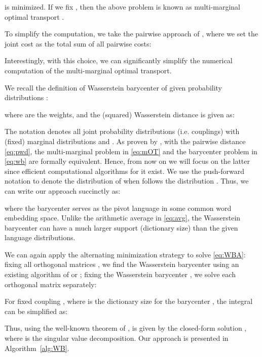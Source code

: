 \documentclass{article}
\begin{document}
is minimized.
If we fix , then the above problem is known as multi-marginal optimal transport \cite{GangboSwiech98}.

To simplify the computation, we take the pairwise approach of \citet{AlauxGCJ19}, where we set the joint cost  as the total sum of all pairwise costs:

Interestingly, with this choice, we can significantly simplify the numerical computation of the multi-marginal optimal transport. 

We recall the definition of Wasserstein barycenter  of  given probability distributions :

where  are the weights, and the (squared) Wasserstein distance  is given as:

The notation  denotes all joint probability distributions (i.e. couplings)  with (fixed) marginal distributions  and .
As proven by \citet{agueh2011barycenter}, with the pairwise distance \eqref{eq:pwd}, the multi-marginal problem in \eqref{eq:mOT} and the barycenter problem in  \eqref{eq:wb} are formally equivalent. Hence, from now on we will focus on the latter since efficient computational algorithms for it exist. We use the push-forward notation  to denote the distribution of  when  follows the distribution . Thus, we can write our approach succinctly as:

where the barycenter  serves as the pivot language in some common word embedding space. Unlike the arithmetic average in \eqref{eq:avg}, the Wasserstein barycenter can have a much larger support (dictionary size) than the  given language distributions.

We can again apply the alternating minimization strategy to solve \eqref{eq:WBA}: fixing all orthogonal matrices , we find the Wasserstein barycenter using an existing algorithm of \cite{cuturi2014fast} or \cite{stochastic-barycenter}; fixing the Wasserstein barycenter , we solve each orthogonal matrix  separately:

For fixed coupling , where  is the dictionary size for the barycenter , the integral can be simplified as:

Thus, using the well-known theorem of \citet{Schonemann1966},  is given by the closed-form solution , where  is the singular value decomposition. Our approach is presented in Algorithm~\ref{alg:WB}.


\iffalse
\begin{figure}
    \centering
    \texttt{[image: c.png]}
    \vspace{-1em}
    \caption{Node  denotes the barycenter of  input languages. On the edges connecting each node,  is the optimal transport plan from language  to the barycenter . }
    \label{fig:barycenter}
\end{figure}
\fi
\end{document}
